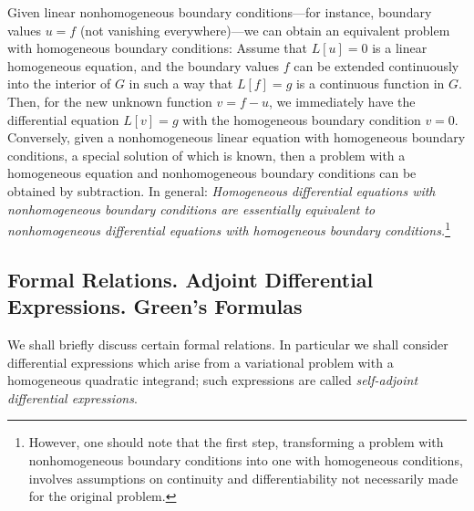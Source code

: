 Given linear nonhomogeneous boundary conditions---for instance, boundary values $u=f$ (not vanishing everywhere)---we can obtain an equivalent problem with homogeneous boundary conditions: Assume that $L[u]=0$ is a linear homogeneous equation, and the boundary values $f$ can be extended continuously into the interior of $G$ in such a way that $L[f]=g$ is a continuous function in $G$. Then, for the new unknown function $v=f-u$, we immediately have the differential equation $L[v]=g$ with the homogeneous boundary condition $v=0$. Conversely, given a nonhomogeneous linear equation with homogeneous boundary conditions, a special solution of which is known, then a problem with a homogeneous equation and nonhomogeneous boundary conditions can be obtained by subtraction. In general: \emph{Homogeneous differential equations with nonhomogeneous boundary conditions are essentially equivalent to nonhomogeneous differential equations with homogeneous boundary conditions.}\footnote{However, one should note that the first step, transforming a problem with nonhomogeneous boundary conditions into one with homogeneous conditions, involves assumptions on continuity and differentiability not necessarily made for the original problem.}

\subsection{Formal Relations. Adjoint Differential Expressions. Green's Formulas}
We shall briefly discuss certain formal relations. In particular we shall consider differential expressions which arise from a variational problem with a homogeneous quadratic integrand; such expressions are called \emph{self-adjoint differential expressions}.

